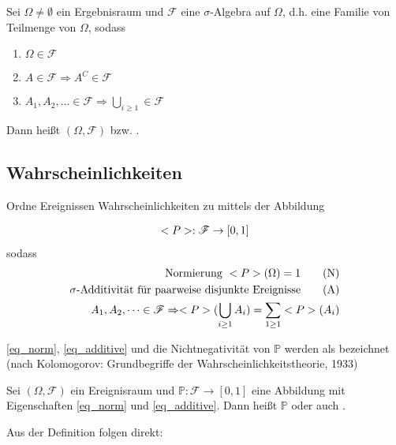 \begin{definition}
	Sei $\Omega \neq \emptyset$ ein Ergebnisraum und $\mathscr{F}$ eine $\sigma$-Algebra auf $\Omega$, d.h. eine Familie von Teilmenge von $\Omega$, sodass
	\begin{enumerate}
		\item $\Omega \in \mathscr{F}$
		\item $A \in \mathscr{F} \Rightarrow A^C \in \mathscr{F}$
		\item $A_1, A_2, \dots \in \mathscr{F} \Rightarrow \bigcup_{i \ge 1} \in \mathscr{F}$
	\end{enumerate}
	Dann heißt $(\Omega, \mathscr{F})$  bzw. .
\end{definition}

\subsection*{Wahrscheinlichkeiten}

Ordne Ereignissen Wahrscheinlichkeiten zu mittels der Abbildung

\begin{align}
	\mathbb{P}: \mathscr{F} \to [0,1]\notag
\end{align}
sodass
\begin{align}
	\text{Normierung } \mathbb{P}(\Omega) = 1 \tag{N}\label{eq_norm}\\
	\sigma\text{-Additivität für paarweise disjunkte Ereignisse} \tag{A}\label{eq_additive}\\
	A_1, A_2, \dots \in \mathscr{F} \Rightarrow \mathbb{P}(\bigcup_{i \ge 1} A_i) = \sum_{1 \ge 1} \mathbb{P}(A_i)\notag
\end{align}

\cref{eq_norm}, \cref{eq_additive} und die Nichtnegativität von $\mathbb{P}$ werden als  bezeichnet (nach Kolomogorov: Grundbegriffe der Wahrscheinlichkeitstheorie, 1933)

\begin{definition}
	Sei $(\Omega, \mathscr{F})$ ein Ereignisraum und $\mathbb{P}: \mathscr{F} \to [0,1]$ eine Abbildung mit Eigenschaften \cref{eq_norm} und \cref{eq_additive}. Dann heißt $\mathbb{P}$  oder auch .
\end{definition}

Aus der Definition folgen direkt:

